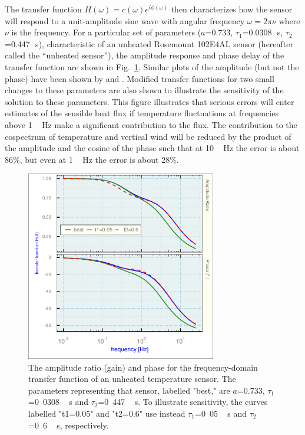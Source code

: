 \documentclass[amt, manuscript]{copernicus}
\begin{document}
The transfer function \(H(\omega)=c(\omega)e^{i\phi(\omega)}\) then
characterizes how the sensor will respond to a unit-amplitude sine wave
with angular frequency \(\omega=2\pi\nu\) where \(\nu\) is the
frequency. For a particular set of parameters (\(a\)=0.733,
\(\tau_{1}\)=0.0308\unit{\,s}, \(\tau_{2}\)=0.447\unit{\,s}),
characteristic of an unheated Rosemount 102E4AL sensor (hereafter called
the ``unheated sensor''), the amplitude response and phase delay of the
transfer function are shown in Fig.~\ref{fig:LTsolution}. Similar plots
of the amplitude (but not the phase) have been shown by
\citet{mccarthy1973method} and \citet{nicholls1978measurements}.
Modified transfer functions for two small changes to these parameters
are also shown to illustrate the sensitivity of the solution to these
parameters. This figure illustrates that serious errors will enter
estimates of the sensible heat flux if temperature fluctuations at
frequencies above \unit{1\,Hz} make a significant contribution to the
flux. The contribution to the cospectrum of temperature and vertical
wind will be reduced by the product of the amplitude and the cosine of
the phase such that at \unit{10\,Hz} the error is about 86\%, but even
at \unit{1\,Hz} the error is about 28\%.

\begin{figure}

\begin{center}\includegraphics[width=8.3cm]{figure/fig1} \end{center}
\caption{The amplitude ratio (gain) and phase for the frequency-domain transfer function of an unheated temperature sensor. The parameters representing that sensor, labelled "best," are $a$=0.733, $\tau_1$=\unit{0.0308\,s} and $\tau_2$=\unit{0.447\,s}. To illustrate sensitivity,  the curves labelled "t1=0.05" and "t2=0.6" use instead $\tau_1$=\unit{0.05\,s} and $\tau_2$=\unit{0.6\,s}, respectively.\label{fig:LTsolution}}
\end{figure}
\end{document}
